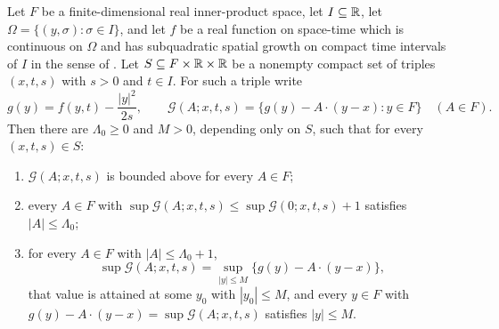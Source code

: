 \begin{lemma}
Let $F$ be a finite-dimensional real inner-product space, let $I\subseteq\mathbb{R}$, let
$\Omega=\{(y,\sigma):\sigma\in I\}$, and let $f$ be a real function on space-time
which is continuous on $\Omega$ and has subquadratic spatial growth on compact
time intervals of $I$ in the sense of . Let
$S\subseteq F\times\mathbb{R}\times\mathbb{R}$ be a nonempty compact set of triples $(x,t,s)$
with $s>0$ and $t\in I$. For such a triple write
\[
  g(y)=f(y,t)-\frac{|y|^2}{2s},
  \qquad
  \mathcal G(A;x,t,s)=\bigl\{g(y)-A\cdot(y-x):y\in F\bigr\}\quad(A\in F).
\]
Then there are $\Lambda_0\ge0$ and $M>0$, depending only on $S$, such that for
every $(x,t,s)\in S$:
\begin{enumerate}
\item[(i)] $\mathcal G(A;x,t,s)$ is bounded above for every $A\in F$;
\item[(ii)] every $A\in F$ with
$\sup\mathcal G(A;x,t,s)\le\sup\mathcal G(0;x,t,s)+1$ satisfies
$|A|\le\Lambda_0$;
\item[(iii)] for every $A\in F$ with $|A|\le\Lambda_0+1$,
\[
  \sup\mathcal G(A;x,t,s)
   =\sup_{|y|\le M}\bigl\{g(y)-A\cdot(y-x)\bigr\},
\]
that value is attained at some $y_0$ with $|y_0|\le M$, and every $y\in F$ with
$g(y)-A\cdot(y-x)=\sup\mathcal G(A;x,t,s)$ satisfies $|y|\le M$.
\end{enumerate}
\end{lemma}

